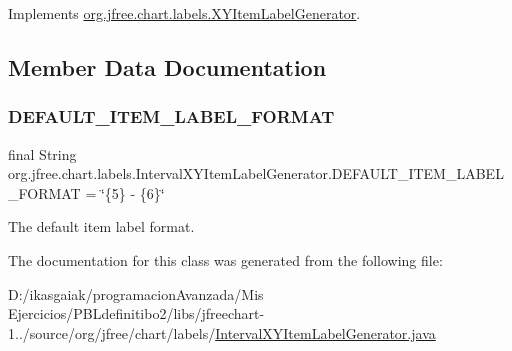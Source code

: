 Implements \mbox{\hyperlink{interfaceorg_1_1jfree_1_1chart_1_1labels_1_1_x_y_item_label_generator_aced931506ef5a2a355b8846534ad457e}{org.\+jfree.\+chart.\+labels.\+X\+Y\+Item\+Label\+Generator}}.



\subsection{Member Data Documentation}
\mbox{\label{classorg_1_1jfree_1_1chart_1_1labels_1_1_interval_x_y_item_label_generator_a4f5c9c3a857535f4deeaeb352b1b7c61}} 
\subsubsection{\texorpdfstring{D\+E\+F\+A\+U\+L\+T\+\_\+\+I\+T\+E\+M\+\_\+\+L\+A\+B\+E\+L\+\_\+\+F\+O\+R\+M\+AT}{DEFAULT\_ITEM\_LABEL\_FORMAT}}
{\footnotesize\ttfamily final String org.\+jfree.\+chart.\+labels.\+Interval\+X\+Y\+Item\+Label\+Generator.\+D\+E\+F\+A\+U\+L\+T\+\_\+\+I\+T\+E\+M\+\_\+\+L\+A\+B\+E\+L\+\_\+\+F\+O\+R\+M\+AT = \char`\"{}\{5\} -\/ \{6\}\char`\"{}\hspace{0.3cm}{\ttfamily [static]}}

The default item label format. 

The documentation for this class was generated from the following file\+:\begin{DoxyCompactItemize}
\item 
D\+:/ikasgaiak/programacion\+Avanzada/\+Mis Ejercicios/\+P\+B\+Ldefinitibo2/libs/jfreechart-\/1../source/org/jfree/chart/labels/\mbox{\hyperlink{_interval_x_y_item_label_generator_8java}{Interval\+X\+Y\+Item\+Label\+Generator.\+java}}\end{DoxyCompactItemize}
